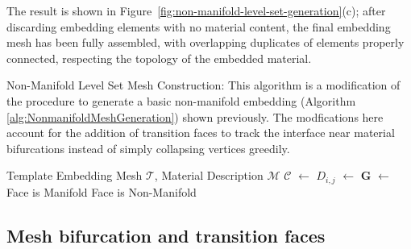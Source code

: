 The result is shown in Figure~\ref{fig:non-manifold-level-set-generation}(c); after discarding embedding elements with no material content, the final embedding
mesh has been fully assembled, with overlapping duplicates of elements properly connected, respecting the topology of the embedded material.

 
\begin{algorithm}
\caption{Non-Manifold Level Set Mesh Construction: This algorithm is a
modification of the procedure to generate a basic non-manifold
embedding (Algorithm \ref{alg:NonmanifoldMeshGeneration}) shown previously. The
modfications here account for the addition of transition faces to
track the interface near material bifurcations instead of simply
collapsing vertices greedily.}
\label{alg:NonmanifoldLevelsetMeshGeneration}
\begin{algorithmic}[1]
\Require Template Embedding Mesh $\mathcal{T}$, Material Description $\mathcal{M}$
     \State $\mathcal{C}$ $\gets$ 
        \State $D_{i,j}$ $\gets$ 
     \EndFor
  \EndFor
      \State  $\mathbf{G}$ $\gets$ 
            \State {}
         \EndIf
      \EndFor
           \Comment Face is Manifold
           \State {}
        \EndIf
           \Comment Face is Non-Manifold
           \State {}
        \EndIf
      \EndFor
   \EndFor
\EndProcedure
\end{algorithmic}
\end{algorithm}

\subsection{Mesh bifurcation and transition faces}


